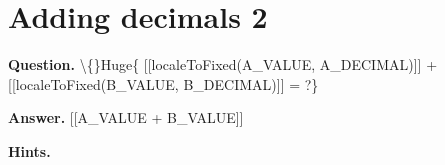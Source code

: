 \documentclass{article}
\begin{document}
\section*{Adding decimals 2}
\textbf{Question.} \textbackslash\{\}Huge\{
                    [[localeToFixed(A\_VALUE, A\_DECIMAL)]] +
                    [[localeToFixed(B\_VALUE, B\_DECIMAL)]] = ?\}

\textbf{Answer.} [[A\_VALUE + B\_VALUE]]

\textbf{Hints.}
\begin{itemize}

\end{itemize}
\end{document}
